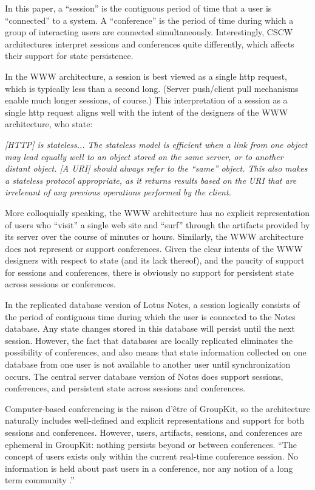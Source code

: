 In this paper, a ``session'' is the contiguous period of time that
a user is ``connected'' to a system. A ``conference'' is the period of time
during which a group of interacting users are connected simultaneously.
Interestingly, CSCW architectures interpret sessions and conferences quite
differently, which affects their support for state persistence.

In the WWW architecture, a session is best viewed as a single http request,
which is typically less than a second long. (Server push/client pull
mechanisms enable much longer sessions, of course.) This interpretation of
a session as a single http request aligns well with the intent of the
designers of the WWW architecture, who state:


{\em 
[HTTP] is stateless... The stateless model is efficient when a link
from one object may lead equally well to an object stored on the same
server, or to another distant object.  [A URI] should always refer
to the ``same'' object. This also makes a stateless protocol appropriate,
as it returns results based on the URI that are irrelevant of any previous
operations performed by the client. \cite{Berners-Lee94}
}

More colloquially speaking, the WWW architecture has no explicit
representation of users who ``visit'' a single web site and ``surf''
through the artifacts provided by its server over the course of minutes or hours.
Similarly, the WWW architecture does not represent or support conferences.
Given the clear intents of the WWW designers with respect to state (and its
lack thereof), and the paucity of support for sessions and conferences,
there is obviously no support for persistent state across sessions or
conferences.

In the replicated database version of Lotus Notes, a session
logically consists of the period of contiguous time during which the user
is connected to the Notes database.  Any state changes stored in
this database will persist until the next session. However, the fact
that databases are locally replicated eliminates the possibility of 
conferences, and also means that state information collected on one 
database from one user is not available to another user until 
synchronization occurs.  The central server database version of Notes
does support sessions, conferences, and persistent state across 
sessions and conferences. 

Computer-based conferencing is the raison d'\^{e}tre of GroupKit, so the
architecture naturally includes well-defined and explicit representations
and support for both sessions and conferences.  However, users, artifacts,
sessions, and conferences are ephemeral in GroupKit: nothing persists
beyond or between conferences. ``The concept of users exists only within
the current real-time conference session.  No information is held about
past users in a conference, nor any notion of a long term community
\cite{Roseman95a}.''


